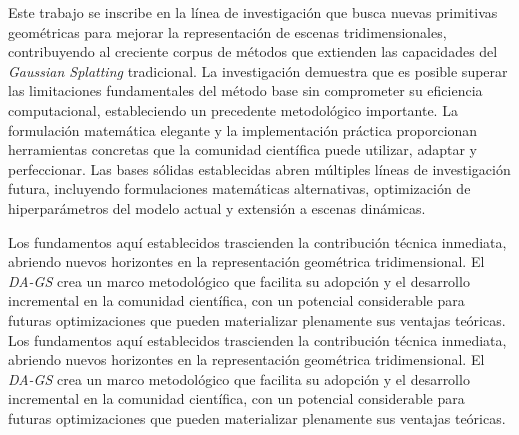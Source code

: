 \begin{conclusions}
Este trabajo se inscribe en la línea de investigación que busca nuevas primitivas geométricas para mejorar la representación de escenas tridimensionales, contribuyendo al creciente corpus de métodos que extienden las capacidades del \textit{Gaussian Splatting} tradicional. La investigación demuestra que es posible superar las limitaciones fundamentales del método base sin comprometer su eficiencia computacional, estableciendo un precedente metodológico importante. La formulación matemática elegante y la implementación práctica proporcionan herramientas concretas que la comunidad científica puede utilizar, adaptar y perfeccionar. Las bases sólidas establecidas abren múltiples líneas de investigación futura, incluyendo formulaciones matemáticas alternativas, optimización de hiperparámetros del modelo actual y extensión a escenas dinámicas.

Los fundamentos aquí establecidos trascienden la contribución técnica inmediata, abriendo nuevos horizontes en la representación geométrica tridimensional.  El \textit{DA-GS} crea un marco metodológico que facilita su adopción y el desarrollo incremental en la comunidad científica, con un potencial considerable para futuras optimizaciones que pueden materializar plenamente sus ventajas teóricas.
Los fundamentos aquí establecidos trascienden la contribución técnica inmediata, abriendo nuevos horizontes en la representación geométrica tridimensional.  El \textit{DA-GS} crea un marco metodológico que facilita su adopción y el desarrollo incremental en la comunidad científica, con un potencial considerable para futuras optimizaciones que pueden materializar plenamente sus ventajas teóricas.
\end{conclusions}